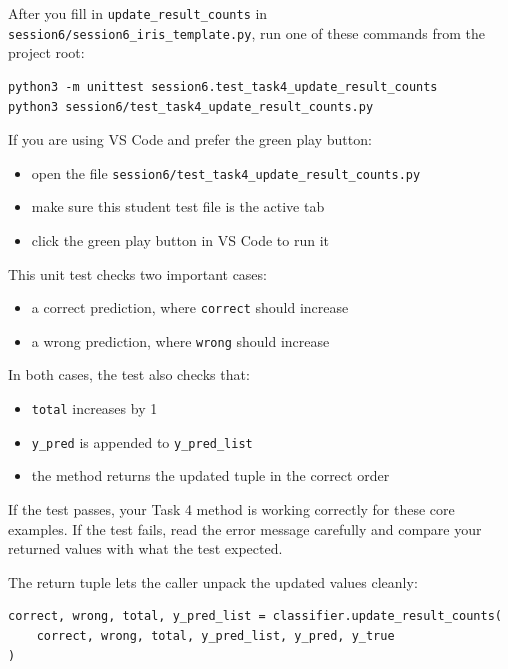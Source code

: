 \begin{tcolorbox}[title=How to test Task 4 with a unit test]
After you fill in \texttt{update\_result\_counts} in \texttt{session6/session6\_iris\_template.py}, run one of these commands from the project root:

\begin{verbatim}
python3 -m unittest session6.test_task4_update_result_counts
python3 session6/test_task4_update_result_counts.py
\end{verbatim}

\noindent
If you are using VS Code and prefer the green play button:
\begin{itemize}\setlength{\itemsep}{2pt}
    \item open the file \texttt{session6/test\_task4\_update\_result\_counts.py}
    \item make sure this student test file is the active tab
    \item click the green play button in VS Code to run it
\end{itemize}

\noindent
This unit test checks two important cases:
\begin{itemize}\setlength{\itemsep}{2pt}
    \item a correct prediction, where \texttt{correct} should increase
    \item a wrong prediction, where \texttt{wrong} should increase
\end{itemize}

\noindent
In both cases, the test also checks that:
\begin{itemize}\setlength{\itemsep}{2pt}
    \item \texttt{total} increases by 1
    \item \texttt{y\_pred} is appended to \texttt{y\_pred\_list}
    \item the method returns the updated tuple in the correct order
\end{itemize}

\noindent
If the test passes, your Task 4 method is working correctly for these core examples.
If the test fails, read the error message carefully and compare your returned values with what the test expected.
\end{tcolorbox}

\noindent
The return tuple lets the caller unpack the updated values cleanly:

\begin{verbatim}
correct, wrong, total, y_pred_list = classifier.update_result_counts(
    correct, wrong, total, y_pred_list, y_pred, y_true
)
\end{verbatim}

